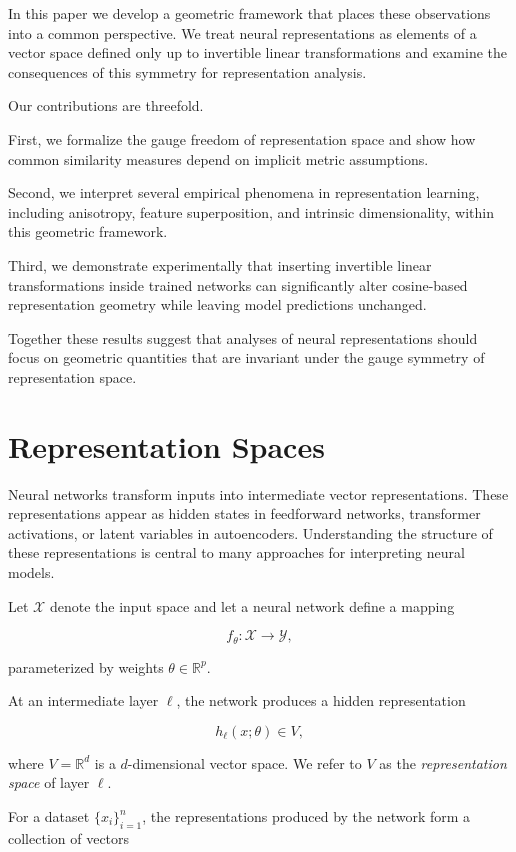 \documentclass[11pt]{article}
\begin{document}
In this paper we develop a geometric framework that places these observations
into a common perspective.
We treat neural representations as elements of a vector space defined only
up to invertible linear transformations and examine the consequences of this
symmetry for representation analysis.

Our contributions are threefold.

First, we formalize the gauge freedom of representation space and show how
common similarity measures depend on implicit metric assumptions.

Second, we interpret several empirical phenomena in representation learning,
including anisotropy, feature superposition, and intrinsic dimensionality,
within this geometric framework.

Third, we demonstrate experimentally that inserting invertible linear
transformations inside trained networks can significantly alter cosine-based
representation geometry while leaving model predictions unchanged.

Together these results suggest that analyses of neural representations should
focus on geometric quantities that are invariant under the gauge symmetry of
representation space.

\section{Representation Spaces}

Neural networks transform inputs into intermediate vector representations.
These representations appear as hidden states in feedforward networks,
transformer activations, or latent variables in autoencoders.
Understanding the structure of these representations is central to many
approaches for interpreting neural models.

Let $\mathcal{X}$ denote the input space and let a neural network define a
mapping

\[
f_\theta : \mathcal{X} \rightarrow \mathcal{Y},
\]

parameterized by weights $\theta \in \mathbb{R}^p$.

At an intermediate layer $\ell$, the network produces a hidden
representation

\[
h_\ell(x;\theta) \in V,
\]

where $V = \mathbb{R}^d$ is a $d$-dimensional vector space.
We refer to $V$ as the \emph{representation space} of layer $\ell$.

For a dataset $\{x_i\}_{i=1}^n$, the representations produced by the
network form a collection of vectors
\end{document}

